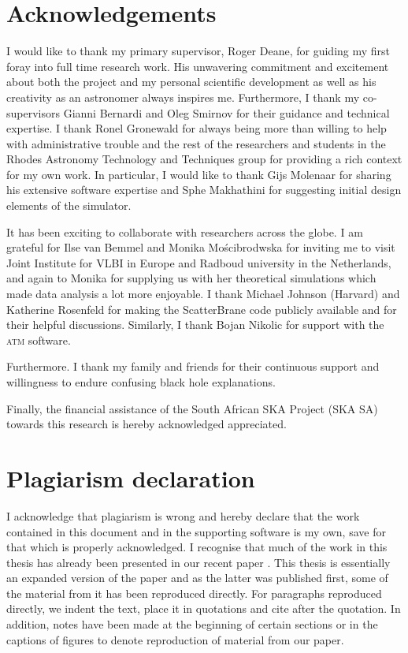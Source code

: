 
 
\chapter*{Acknowledgements}
I would like to thank my primary supervisor, Roger Deane, for guiding my first foray into full time research work. His unwavering commitment and excitement about both the project and my personal scientific development as well as his creativity as an astronomer always inspires me. Furthermore, I thank my co-supervisors Gianni Bernardi and Oleg Smirnov for their guidance and technical expertise. I thank Ronel Gronewald for always being more than willing to help with administrative trouble and the rest of the researchers and students in the Rhodes Astronomy Technology and Techniques group for providing a rich context for my own work. In particular, I would like to thank Gijs Molenaar for sharing his extensive software expertise and Sphe Makhathini for suggesting initial design elements of the simulator. 


It has been exciting to collaborate with researchers across the globe. I am grateful for Ilse van Bemmel and Monika Mo\'{s}cibrodwska for inviting me to visit Joint Institute for VLBI in Europe and Radboud university in the Netherlands, and again to Monika for supplying us with her theoretical simulations which made data analysis a lot more enjoyable. I thank Michael Johnson (Harvard) and Katherine Rosenfeld for making the {\sc ScatterBrane} code publicly available and for their helpful discussions. Similarly, I thank Bojan Nikolic for support with the \textsc{atm} software.  

Furthermore. I thank my family and friends for their continuous support and willingness to endure confusing black hole explanations.

Finally, the financial assistance of the South African SKA Project (SKA SA) towards this research is hereby acknowledged appreciated. 

\chapter*{Plagiarism declaration}
 I acknowledge that plagiarism is wrong and hereby declare that the work contained in this document and in the supporting software is my own, save for that which is properly acknowledged. I recognise that much of the work in this thesis has already been presented in our recent paper \citep{Blecher_2016}. This thesis is essentially an expanded version of the paper and as the latter was published first, some of the material from it has been reproduced directly. For paragraphs reproduced directly, we indent the text, place it in quotations and cite \citep{Blecher_2016} after the quotation. In addition, notes have been made at the beginning of certain sections or in the captions of figures to denote reproduction of material from our paper.
 \vspace{55pt}
 
